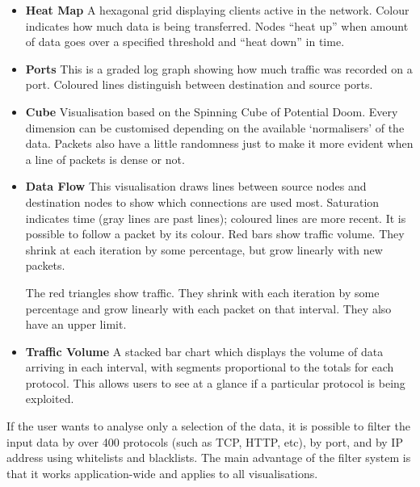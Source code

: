 \documentclass[12pt,a4paper]{article}
\begin{document}
			\begin{itemize}
            
            \item \textbf{Heat Map} A hexagonal grid displaying clients active in the network. Colour indicates how much data is being transferred. Nodes ``heat up'' when amount of data goes over a specified threshold and ``heat down'' in time.

            \item \textbf{Ports} This is a graded log graph showing how much traffic was recorded on a port. Coloured lines distinguish between destination and source ports.

            \item \textbf{Cube} Visualisation based on the Spinning Cube of Potential Doom. Every dimension can be customised depending on the available `normalisers' of the data. Packets also have a little randomness just to make it more evident when a line of packets is dense or not.

            \item \textbf{Data Flow} This visualisation draws lines between source nodes and destination nodes to show which connections are used most. Saturation indicates time (gray lines are past lines); coloured lines are more recent. It is possible to follow a packet by its colour. Red bars show traffic volume. They shrink at each iteration by some percentage, but grow linearly with new packets.
            
            The red triangles show traffic. They shrink with each iteration by some
            percentage and grow linearly with each packet on that interval. They also
            have an upper limit.

            \item \textbf{Traffic Volume} A stacked bar chart which displays the volume of data arriving in each interval, with segments proportional to the totals for each protocol. This allows users to see at a glance if a particular protocol is being exploited.
            
            \end{itemize}
			
			If the user wants to analyse only a selection of the data, it is possible to filter the input data by over 400 protocols (such as TCP, HTTP, etc), by port, and by IP address using whitelists and blacklists. The main advantage of the filter system is that it works application-wide and applies to all visualisations.
			
\end{document}
